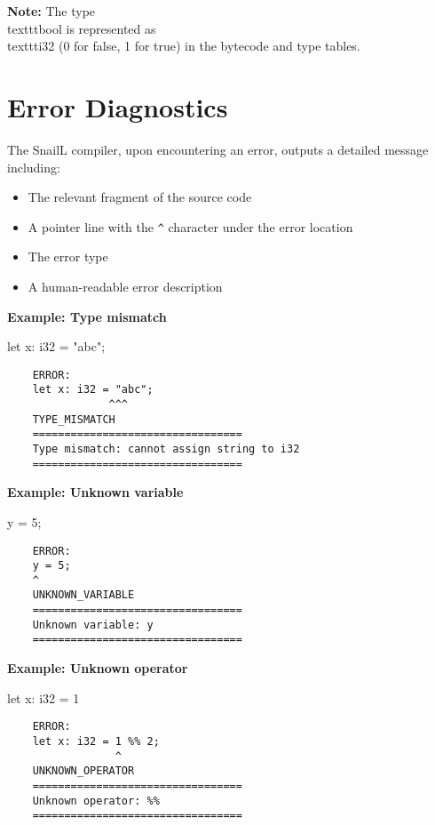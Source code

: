 \documentclass[a4paper,12pt]{article}
\begin{document}
    \textbf{Note:} The type \\texttt{bool} is represented as \\texttt{i32} (0 for false, 1 for true) in the bytecode and type tables.

    \section{Error Diagnostics}

    The SnailL compiler, upon encountering an error, outputs a detailed message including:
    \begin{itemize}
      \item The relevant fragment of the source code
      \item A pointer line with the \texttt{^} character under the error location
      \item The error type
      \item A human-readable error description
    \end{itemize}

    \textbf{Example: Type mismatch}
    \begin{snailcode}
    let x: i32 = "abc";
    \end{snailcode}
    \begin{verbatim}
    ERROR:
    let x: i32 = "abc";
                ^^^
    TYPE_MISMATCH
    =================================
    Type mismatch: cannot assign string to i32
    =================================
    \end{verbatim}

    \textbf{Example: Unknown variable}
    \begin{snailcode}
    y = 5;
    \end{snailcode}
    \begin{verbatim}
    ERROR:
    y = 5;
    ^
    UNKNOWN_VARIABLE
    =================================
    Unknown variable: y
    =================================
    \end{verbatim}

    \textbf{Example: Unknown operator}
    \begin{snailcode}
    let x: i32 = 1 %
    \end{snailcode}
    \begin{verbatim}
    ERROR:
    let x: i32 = 1 %% 2;
                 ^
    UNKNOWN_OPERATOR
    =================================
    Unknown operator: %%
    =================================
    \end{verbatim}
\end{document}
